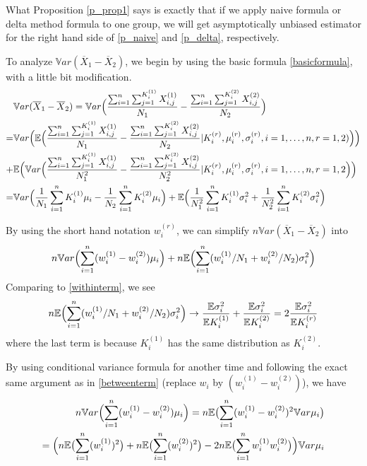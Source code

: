 \documentclass[12pt,letterpaper]{article}
\newcommand{\var}{\ensuremath{\mathbb Var}}
\newcommand{\bbe}{\mathbb{E}}
\newcommand{\xbar}{\overline{X}}
\begin{document}
What Proposition \ref{p_prop1} says is exactly that if we apply naive formula or delta method formula to one group, we will get asymptotically unbiased estimator for the right hand side of \eqref{p_naive} and \eqref{p_delta}, respectively. 

To analyze $\var (\xbar_1-\xbar_2)$, we begin by using the basic formula \eqref{basicformula}, with  a little bit modification. 
\begin{align}
&\var (\xbar_1-\xbar_2) = \var \Bigl( \frac{\sum_{i=1}^n\sum_{j=1}^{K_i^{(1)}} X_{i,j}^{(1)}}{N_1} -\frac{\sum_{i=1}^n\sum_{j=1}^{K_i^{(2)}} X_{i,j}^{(2)}}{N_2}\Bigr) \notag \\
 =& \var \Bigl( \bbe \Bigl( \frac{\sum_{i=1}^n\sum_{j=1}^{K_i^{(1)}} X_{i,j}^{(1)}}{N_1} -\frac{\sum_{i=1}^n\sum_{j=1}^{K_i^{(2)}} X_{i,j}^{(2)}}{N_2}|K_i^{(r)}, \mu_i^{(r)},\sigma_i^{(r)},i=1,\dots,n, r=1,2) \Bigr)\Bigr)\notag \\
+&\bbe \Bigl(\var \Bigl( \frac{\sum_{i=1}^n\sum_{j=1}^{K_i^{(1)}} X_{i,j}^{(1)}}{N_1^2} -\frac{\sum_{i=1}^n\sum_{j=1}^{K_i^{(2)}} X_{i,j}^{(2)}}{N_2^2}|K_i^{(r)}, \mu_i^{(r)},\sigma_i^{(r)},i=1,\dots,n, r=1,2\Bigr)\Bigr) \notag\\
=&\var \Bigl(\frac{1}{N_1}\sum_{i=1}^n K_i^{(1)} \mu_i  - \frac{1}{N_2}\sum_{i=1}^n K_i^{(2)} \mu_i\Bigr)+\bbe \Bigl(\frac{1}{N_1^2}\sum_{i=1}^n K_i^{(1)} \sigma^2_i   + \frac{1}{N_2^2}\sum_{i=1}^n K_i^{(2)} \sigma^2_i \Bigr)  \label{basicformula2}
\end{align}

By using the short hand notation $w_i^{(r)}$, we can simplify $n\var (\xbar_1-\xbar_2)  $ into 
\begin{align}
n\var\Bigl( \sum_{i=1}^n (w_i^{(1)}-w_i^{(2)})\mu_i\Bigr) + n\bbe \Bigl( \sum_{i=1}^n (w_i^{(1)}/N_1+w_i^{(2)}/N_2)\sigma_i^2\Bigr)
\end{align}
Comparing to \eqref{withinterm}, we see
\begin{align}
n\bbe \Bigl( \sum_{i=1}^n (w_i^{(1)}/N_1+w_i^{(2)}/N_2)\sigma_i^2\Bigr) \to \frac{\bbe \sigma_i^2}{\bbe K_i^{(1)}}+ \frac{\bbe \sigma_i^2}{\bbe K_i^{(2)}} = 2 \frac{\bbe \sigma_i^2}{\bbe K_i^{(r)}} \label{p_within}
\end{align}
where the last term is because $K_i^{(1)}$ has the same distribution as $K_i^{(2)}$. 


By using conditional variance formula for another time and following the exact same argument as in \eqref{betweenterm} (replace $w_i$ by $(w_i^{(1)}-w_i^{(2)})$), we have
\begin{align}
n\var\Bigl( \sum_{i=1}^n (w_i^{(1)}-w_i^{(2)})\mu_i\Bigr) = n\bbe \bigl( \sum_{i=1}^n (w_i^{(1)}-w_i^{(2)})^2 \var \mu_i\bigr) \notag \\
= \Bigl( n\bbe \bigl (\sum_{i=1}^n (w_i^{(1)})^2\bigr)+ n\bbe \bigl (\sum_{i=1}^n (w_i^{(2)})^2\bigr)-2 n\bbe\bigl( \sum_{i=1}^n w_i^{(1)}w_i^{(2)}\bigr)\Bigl) \var \mu_i
\end{align}
\end{document}
